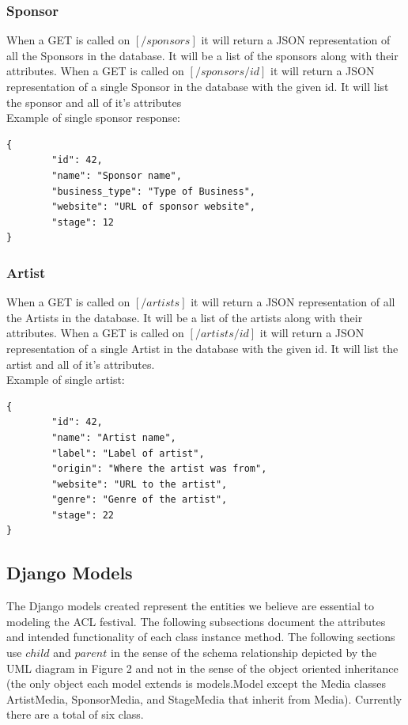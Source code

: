 \documentclass[12pt,english]{scrartcl}
\begin{document}
\subsubsection{Sponsor}
When a GET is called on $[/sponsors]$ it will return a JSON representation of all the Sponsors in the database.  It will be a list of the sponsors along with their attributes.
When a GET is called on $[/sponsors/{id}]$ it will return a JSON representation of a single Sponsor in the database with the given id.  It will list the sponsor and all of it's attributes
\\
Example of single sponsor response:
\begin{verbatim}
{
        "id": 42,
        "name": "Sponsor name",
        "business_type": "Type of Business",
        "website": "URL of sponsor website",
        "stage": 12
}
\end{verbatim}

\subsubsection{Artist}
When a GET is called on $[/artists]$ it will return a JSON representation of all the Artists in the database.  It will be a list of the artists along with their attributes.
When a GET is called on $[/artists/{id}]$ it will return a JSON representation of a single Artist in the database with the given id.  It will list the artist and all of it's attributes.
\\
Example of single artist:
\begin{verbatim}
{
        "id": 42,
        "name": "Artist name",
        "label": "Label of artist",
        "origin": "Where the artist was from",
        "website": "URL to the artist",
        "genre": "Genre of the artist",
        "stage": 22
}
\end{verbatim}

\subsection{Django Models}
The Django models created represent the entities we believe are essential to modeling the ACL festival.
The following subsections document the attributes and intended functionality of each class instance method. The following sections use
$child$ and $parent$ in the sense of the schema relationship depicted by the UML diagram in Figure 2 and not in the sense of the object oriented inheritance 
(the only object each model extends is models.Model except the Media classes ArtistMedia, SponsorMedia, and StageMedia that inherit from Media). Currently there are a total of six class.
\end{document}
